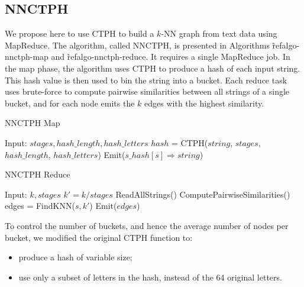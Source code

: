 \documentclass[wcp]{jmlr}
\begin{document}
\subsection{NNCTPH}

We propose here to use CTPH to build a $k$-NN graph from text data using MapReduce. The algorithm, called NNCTPH, is presented in Algorithms \~ref{algo-nnctph-map} and \~ref{algo-nnctph-reduce}. It requires a single MapReduce job. In the map phase, the algorithm uses CTPH to produce a hash of each input string. This hash value is then used to bin the string into a bucket. Each reduce task uses brute-force to compute pairwise similarities between all strings of a single bucket, and for each node emits the $k$ edges with the highest similarity.

\begin{algorithm}
\caption{NNCTPH Map}
\label{algo-nnctph-map}
\begin{algorithmic}
\State Input: $stages, hash\_length, hash\_letters$
\State
{}
  \State $hash$ = CTPH($string$, $stages$, $hash\_length$, $hash\_letters$)
    \State Emit($s\_hash[s] \Rightarrow string$)
  \EndFor
\EndProcedure
\end{algorithmic}
\end{algorithm}

\begin{algorithm}
\caption{NNCTPH Reduce}
\label{algo-nnctph-reduce}
\begin{algorithmic}
\State Input: $k, stages$
\State
{}
  \State $k' = k / stages$
  \State ReadAllStrings()
  \State ComputePairwiseSimilarities()
    \State edges = FindKNN($s, k'$)
    \State Emit($edges$)
  \EndFor
\EndProcedure
\end{algorithmic}
\end{algorithm}

To control the number of buckets, and hence the average number of nodes per bucket, we modified the original CTPH function to:

\begin{itemize}
	\item produce a hash of variable size;
	\item use only a subset of letters in the hash, instead of the 64 original letters.
\end{itemize}
\end{document}
